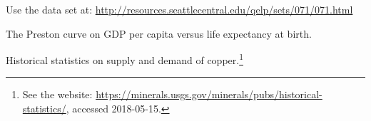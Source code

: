 \documentclass[a4paper,oneside,12pt]{article}
\begin{document}
\begin{problem}
{\begin{solution}
\end{solution}
}{}

\item Use the data set at:
  \url{http://resources.seattlecentral.edu/qelp/sets/071/071.html}

\item The Preston curve on GDP per capita versus life expectancy at
  birth.

\item Historical statistics on supply and demand of copper.\footnote{
    See the website:
    \url{https://minerals.usgs.gov/minerals/pubs/historical-statistics/},
    accessed 2018-05-15.
  }
\end{problem}
\end{document}
